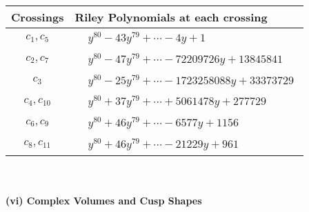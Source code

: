 \documentclass[1p]{elsarticle_modified}
\theoremstyle{definition}
\begin{document}
\begin{tabular}{m{50pt}|m{274pt}}
Crossings & \hspace{64pt}Riley Polynomials at each crossing \\
\hline $$\begin{aligned}c_{1},c_{5}\end{aligned}$$&$\begin{aligned}
&y^{80}-43 y^{79}+\cdots-4 y+1
\end{aligned}$\\
\hline $$\begin{aligned}c_{2},c_{7}\end{aligned}$$&$\begin{aligned}
&y^{80}-47 y^{79}+\cdots-72209726 y+13845841
\end{aligned}$\\
\hline $$\begin{aligned}c_{3}\end{aligned}$$&$\begin{aligned}
&y^{80}-25 y^{79}+\cdots-1723258088 y+33373729
\end{aligned}$\\
\hline $$\begin{aligned}c_{4},c_{10}\end{aligned}$$&$\begin{aligned}
&y^{80}+37 y^{79}+\cdots+5061478 y+277729
\end{aligned}$\\
\hline $$\begin{aligned}c_{6},c_{9}\end{aligned}$$&$\begin{aligned}
&y^{80}+46 y^{79}+\cdots-6577 y+1156
\end{aligned}$\\
\hline $$\begin{aligned}c_{8},c_{11}\end{aligned}$$&$\begin{aligned}
&y^{80}+46 y^{79}+\cdots-21229 y+961
\end{aligned}$\\
\hline
\end{tabular}\\~\\
\newpage\flushleft \textbf{(vi) Complex Volumes and Cusp Shapes}
\end{document}
